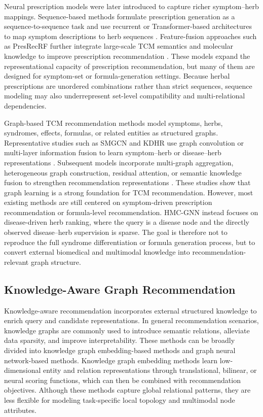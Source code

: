 \documentclass[journal,twoside,web]{ieeecolor}
\begin{document}
Neural prescription models were later introduced to capture richer symptom--herb mappings. Sequence-based methods formulate prescription generation as a sequence-to-sequence task and use recurrent or Transformer-based architectures to map symptom descriptions to herb sequences \cite{ref27,ref29,ref30,ref31,ref32,ref33,ref34}. Feature-fusion approaches such as PresRecRF further integrate large-scale TCM semantics and molecular knowledge to improve prescription recommendation \cite{ref28}. These models expand the representational capacity of prescription recommendation, but many of them are designed for symptom-set or formula-generation settings. Because herbal prescriptions are unordered combinations rather than strict sequences, sequence modeling may also underrepresent set-level compatibility and multi-relational dependencies.

Graph-based TCM recommendation methods model symptoms, herbs, syndromes, effects, formulas, or related entities as structured graphs. Representative studies such as SMGCN and KDHR use graph convolution or multi-layer information fusion to learn symptom--herb or disease--herb representations \cite{ref36,ref11,ref38}. Subsequent models incorporate multi-graph aggregation, heterogeneous graph construction, residual attention, or semantic knowledge fusion to strengthen recommendation representations \cite{ref39,ref40,ref41,ref55}. These studies show that graph learning is a strong foundation for TCM recommendation. However, most existing methods are still centered on symptom-driven prescription recommendation or formula-level recommendation. HMC-GNN instead focuses on disease-driven herb ranking, where the query is a disease node and the directly observed disease--herb supervision is sparse. The goal is therefore not to reproduce the full syndrome differentiation or formula generation process, but to convert external biomedical and multimodal knowledge into recommendation-relevant graph structure.

\subsection{Knowledge-Aware Graph Recommendation}

Knowledge-aware recommendation incorporates external structured knowledge to enrich query and candidate representations. In general recommendation scenarios, knowledge graphs are commonly used to introduce semantic relations, alleviate data sparsity, and improve interpretability. These methods can be broadly divided into knowledge graph embedding-based methods and graph neural network-based methods. Knowledge graph embedding methods learn low-dimensional entity and relation representations through translational, bilinear, or neural scoring functions, which can then be combined with recommendation objectives. Although these methods capture global relational patterns, they are less flexible for modeling task-specific local topology and multimodal node attributes.
\end{document}
